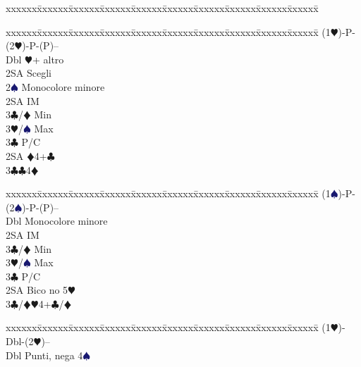 \documentclass[a4paper,italian]{article}
\newcommand{\BC}{\textcolor{OliveGreen}{$\clubsuit$}}
\newcommand{\BD}{\textcolor{RedOrange}{$\vardiamondsuit$}}
\newcommand{\BH}{\textcolor{Red2}{$\varheartsuit${}}}
\newcommand{\BS}{\textcolor{MidnightBlue}{$\spadesuit${}}}
\newenvironment{bidtable}
{\begin{tabbing}

    xxxxxx\=xxxxxx\=xxxxxx\=xxxxxx\=xxxxxx\=xxxxxx\=xxxxxx\=xxxxxx\=xxxxxx\=xxxxxx\=\kill}
{\end{tabbing} }%
\begin{document}
\begin{multicols}{2}
\begin{bidtable}
                                        \end{bidtable}
                                        \columnbreak
                                        \begin{bidtable}
                                            (1\BH)-P-(2\BH)-P-(P)--\\
                                            Dbl \BH + altro\\
                                            \>2SA Scegli\\
                                            2\BS \> Monocolore minore\+\\
                                            2SA \> IM\+\\
                                            3\BC/\BD \> Min\\
                                            3\BH/\BS \> Max\-\\
                                            3\BC \> P/C\-\\
                                            2SA \BD 4+\BC \\
                                            3\BC {}\BC 4\BD
                                        \end{bidtable}
                                        \begin{bidtable}
                                            (1\BS)-P-(2\BS)-P-(P)--\\
                                            Dbl \> Monocolore minore\+\\
                                            2SA \> IM\+\\
                                            3\BC/\BD \> Min\\
                                            3\BH/\BS \> Max\-\\
                                            3\BC \> P/C\-\\
                                            2SA \> Bico no 5\BH \\
                                            3\BC/\BD {}\BH 4+\BC /\BD
                                        \end{bidtable}
                                        \begin{bidtable}
                                            (1\BH)-Dbl-(2\BH)--\\
                                            Dbl\> Punti, nega 4\BS\\

\end{bidtable}
\end{multicols}
\end{document}
